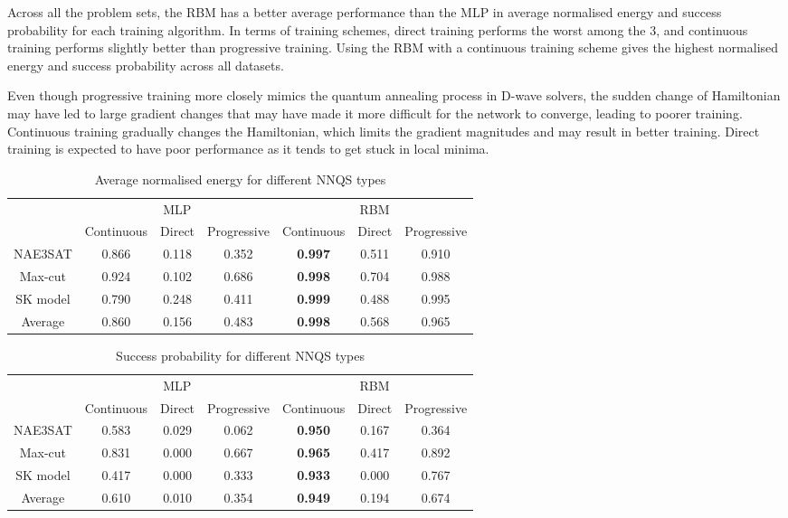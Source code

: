 Across all the problem sets, the RBM has a better average performance than the MLP in average normalised energy and success probability for each training algorithm. In terms of training schemes, direct training performs the worst among the 3, and continuous training performs slightly better than progressive training. Using the RBM with a continuous training scheme gives the highest normalised energy and success probability across all datasets. 

Even though progressive training more closely mimics the quantum annealing process in D-wave solvers, the sudden change of Hamiltonian may have led to large gradient changes that may have made it more difficult for the network to converge, leading to poorer training. Continuous training gradually changes the Hamiltonian, which limits the gradient magnitudes and may result in better training. Direct training is expected to have poor performance as it tends to get stuck in local minima.


\begin{table}[!htb]
    \centering
    \begin{tabular}{ccccccc} \toprule
        ~ & \multicolumn{3}{c}{MLP} & \multicolumn{3}{c}{RBM} \\
        \cmidrule{2-7} & Continuous & Direct & Progressive & Continuous & Direct & Progressive \\
        \midrule
        NAE3SAT & 0.866 & 0.118 & 0.352 & \textbf{0.997} & 0.511 & 0.910 \\
        Max-cut & 0.924 & 0.102 & 0.686 & \textbf{0.998} & 0.704 & 0.988 \\
        SK model & 0.790 & 0.248 & 0.411 & \textbf{0.999} & 0.488 & 0.995 \\ \midrule
        Average & 0.860 & 0.156 & 0.483 & \textbf{0.998} & 0.568 & 0.965 \\ \bottomrule
    \end{tabular}
    \caption{Average normalised energy for different NNQS types}
    \label{results:nnqsnormalizedenergy}
\end{table}

\begin{table}[!htb]
    \centering
    \begin{tabular}{ccccccc} \toprule
        ~ & \multicolumn{3}{c}{MLP} & \multicolumn{3}{c}{RBM} \\
        \cmidrule{2-7} & Continuous & Direct & Progressive & Continuous & Direct & Progressive \\
        \midrule
        NAE3SAT & 0.583 & 0.029 & 0.062 & \textbf{0.950} & 0.167 & 0.364 \\
        Max-cut & 0.831 & 0.000 & 0.667 & \textbf{0.965} & 0.417 & 0.892 \\
        SK model & 0.417 & 0.000 & 0.333 & \textbf{0.933} & 0.000 & 0.767 \\ \midrule
        Average & 0.610 & 0.010 & 0.354 & \textbf{0.949} & 0.194 & 0.674 \\ \bottomrule
    \end{tabular}
    \caption{Success probability for different NNQS types}
    \label{results:nnqssuccess}
\end{table}